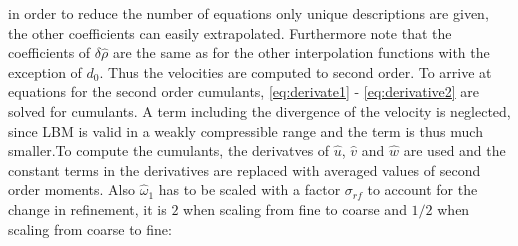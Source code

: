 in order to reduce the number of equations only unique descriptions are given, the other coefficients can easily extrapolated. Furthermore note that the coefficients of $\delta \hat{\rho}$ are the same as for the other interpolation functions with the exception of $d_0$.
Thus the velocities are computed to second order. To arrive at equations for the second order cumulants, \eqref{eq:derivate1} - \eqref{eq:derivative2} are solved for cumulants. A term including the divergence of the velocity is neglected, since LBM is valid in a weakly compressible range and the term is thus much smaller.To compute the cumulants, the derivatves of $\hat{u}$, $\hat{v}$ and $\hat{w}$ are used and the constant terms in the derivatives are replaced with averaged values of second order moments. Also $\hat{\omega}_1$ has to be scaled with a factor $\sigma_{rf}$ to account for the change in refinement, it is $2$ when scaling from fine to coarse and $1/2$ when scaling from coarse to fine:

